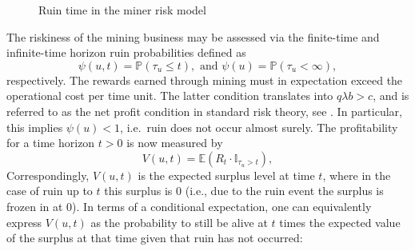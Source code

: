 \begin{figure}[!ht]
\begin{center}
\end{center}
\caption{Ruin time in the miner risk model}
\label{fig:ruin_time_miner}
\end{figure}
The riskiness of the mining business may be assessed via the finite-time and infinite-time horizon ruin probabilities defined as 
\begin{equation}\label{eq:ruin_probabilities}
\psi(u,t) = \mathbb{P}(\tau_u\leq t),\text{ and }\psi(u)=\mathbb{P}(\tau_u<\infty), 
\end{equation}
respectively. The rewards earned through mining must in expectation exceed the operational cost per time unit. The latter condition translates into $q\lambda b > c$, and is referred to as the net profit condition in standard risk theory, see \citet{Asmussen_2010}. In particular, this implies $\psi(u)<1$, i.e.\ ruin does not occur almost surely. The profitability for a time horizon $t>0$ is now measured by
\begin{equation}\label{eq:value_function_finite_time}
V(u,t) = \mathbb{E}(R_t\cdot \mathbb{I}_{\tau_u>t}),
\end{equation}
Correspondingly, $V(u,t)$ is the expected surplus level at time $t$, where in the case of ruin up to $t$ this surplus is $0$ (i.e., due to the ruin event the surplus is frozen in at $0$). In terms of a conditional expectation, one can equivalently express $V(u,t)$ as the probability to still be alive at $t$ times the expected value of the surplus at that time given that ruin has not occurred:
